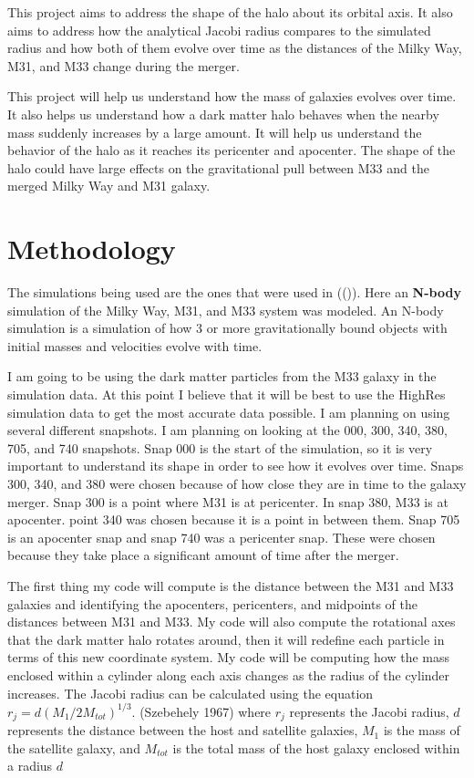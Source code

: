 \documentclass[fleqn,usenatbib]{mnras}
\begin{document}
        This project aims to address the shape of the halo about its orbital axis. It also aims to address how the analytical Jacobi radius compares to the simulated radius and how both of them evolve over time as the distances of the Milky Way, M31, and M33 change during the merger.


        This project will help us understand how the mass of galaxies evolves over time. It also helps us understand how a dark matter halo behaves when the nearby mass suddenly increases by a large amount. It will help us understand the behavior of the halo as it reaches its pericenter and apocenter. The shape of the halo could have large effects on the gravitational pull between M33 and the merged Milky Way and M31 galaxy.



\section{Methodology}
        The simulations being used are the ones that were used in ((\citet{vanderMarel2012})). Here an \textbf{N-body} simulation of the Milky Way, M31, and M33 system was modeled. An N-body simulation is a simulation of how 3 or more gravitationally bound objects with initial masses and velocities evolve with time.

        I am going to be using the dark matter particles from the M33 galaxy in the simulation data. At this point I believe that it will be best to use the HighRes simulation data to get the most accurate data possible. I am planning on using several different snapshots. I am planning on looking at the 000, 300, 340, 380, 705, and 740 snapshots. Snap 000 is the start of the simulation, so it is very important to understand its shape in order to see how it evolves over time. Snaps 300, 340, and 380 were chosen because of how close they are in time to the galaxy merger. Snap 300 is a point where M31 is at pericenter. In snap 380, M33 is at apocenter. point 340 was chosen because it is a point in between them. Snap 705 is an apocenter snap and snap 740 was a pericenter snap. These were chosen because they take place a significant amount of time after the merger.


        The first thing my code will compute is the distance between the M31 and M33 galaxies and identifying the apocenters, pericenters, and midpoints of the distances between M31 and M33. My code will also compute the rotational axes that the dark matter halo rotates around, then it will redefine each particle in terms of this new coordinate system. My code will be computing how the mass enclosed within a cylinder along each axis changes as the radius of the cylinder increases. The Jacobi radius can be calculated using the equation $r_j = d(M_1/{2M_{tot}})^{1/3}$. (Szebehely 1967) where $r_j$ represents the Jacobi radius, $d$ represents the distance between the host and satellite galaxies, $M_1$ is the mass of the satellite galaxy, and $M_{tot}$ is the total mass of the host galaxy enclosed within a radius $d$
\end{document}
